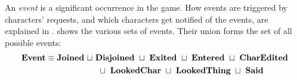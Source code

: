 An {\em event} is a significant occurrence in the game. How events are
triggered by characters' requests, and which characters get notified
of the events, are explained in .
 shows the various sets of events. Their union forms
the set of all possible events:
\begin{align}
  \textbf{Event} \equiv \textbf{Joined}
  ~\sqcup~ & \textbf{Disjoined}
  ~\sqcup~ \textbf{Exited}
  ~\sqcup~ \textbf{Entered}
  ~\sqcup~ \textbf{CharEdited} \\ \nonumber
  & ~\sqcup~ \textbf{LookedChar} ~\sqcup~ \textbf{LookedThing}
  ~\sqcup~ \textbf{Said}
\end{align}


